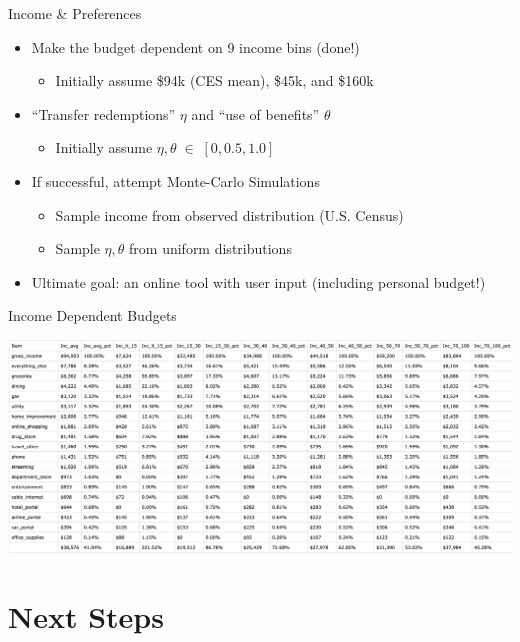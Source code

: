 \begin{frame}{Income \& Preferences}
    \begin{itemize}
        \item Make the budget dependent on 9 income bins (done!)
        \begin{itemize}
            \item Initially assume \$94k (CES mean), \$45k, and \$160k
        \end{itemize}
        \bigskip
        \item ``Transfer redemptions'' $\eta$ and ``use of benefits'' $\theta$
        \begin{itemize}
            \item Initially assume $\eta, \theta \; \in \; [0, 0.5, 1.0]$
        \end{itemize}
        \bigskip
        \item If successful, attempt Monte-Carlo Simulations
        \begin{itemize}
        \item Sample income from observed distribution (U.S. Census)
        \item Sample $\eta, \theta$ from uniform distributions
        \end{itemize}
        \bigskip
        \item Ultimate goal: an online tool with user input (including personal budget!)
   \end{itemize}
\end{frame}

\begin{frame}{Income Dependent Budgets}
    \begin{center}
        \includegraphics[scale=0.4]{../Misc/BudgetIncome.png}
    \end{center}
\end{frame}


\section{Next Steps}

